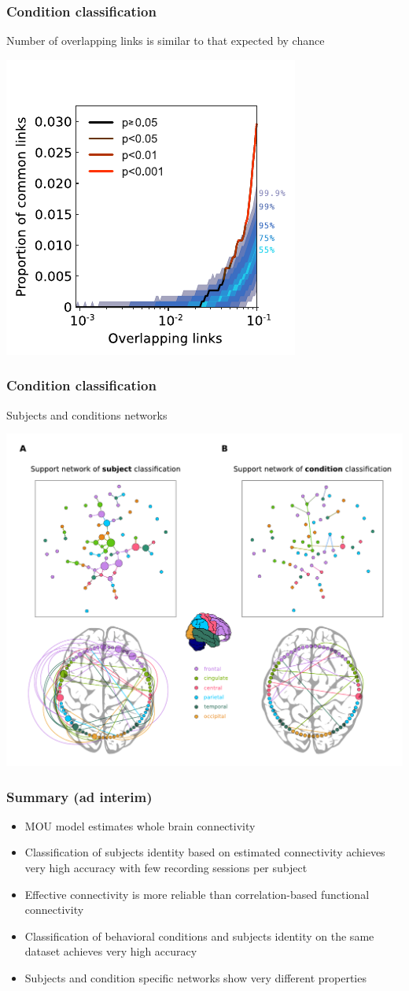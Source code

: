 \documentclass[final]{beamer}
\begin{document}
\begin{frame}
\frametitle{Condition classification}
Number of overlapping links is similar to that expected by chance
\begin{center}
\includegraphics[width=0.5\columnwidth]{cond_H0}
\end{center}
\end{frame}

\begin{frame}
\frametitle{Condition classification}
Subjects and conditions networks
\begin{center}
\includegraphics[width=0.7\columnwidth]{fig5}
\end{center}
\end{frame}

\begin{frame}
	\frametitle{Summary (ad interim)}
	\begin{itemize}
		\item MOU model estimates whole brain connectivity
		\item Classification of subjects identity based on estimated connectivity achieves very high accuracy with few recording sessions per subject
		\item Effective connectivity is more reliable than correlation-based functional connectivity
		\item Classification of behavioral conditions and subjects identity on the same dataset achieves very high accuracy
		\item Subjects and condition specific networks show very different properties
	\end{itemize}
\end{frame}
\end{document}
